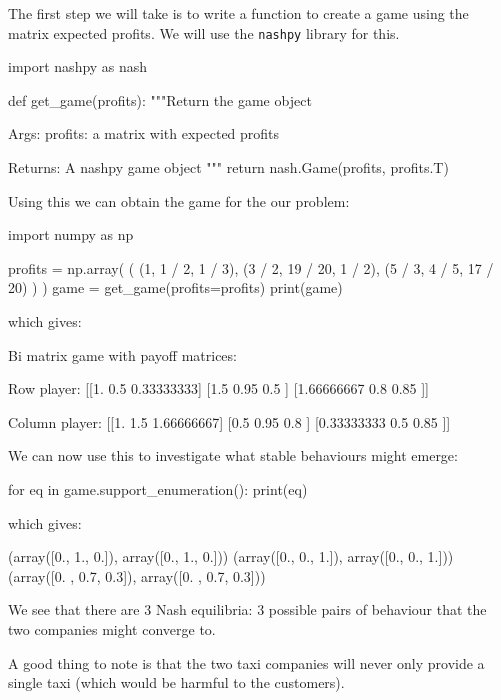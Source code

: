 The first step we will take is to write a function to create a game using the
matrix expected profits. We will use the \texttt{nashpy} library for
this.

\begin{pyin}
import nashpy as nash


def get_game(profits):
    """Return the game object

    Args:
        profits: a matrix with expected profits

    Returns:
        A nashpy game object
    """
    return nash.Game(profits, profits.T)
\end{pyin}

Using this we can obtain the game for the our problem:

\begin{pyin}
import numpy as np

profits = np.array(
    (
        (1, 1 / 2, 1 / 3),
        (3 / 2, 19 / 20, 1 / 2),
        (5 / 3, 4 / 5, 17 / 20)
    )
)
game = get_game(profits=profits)
print(game)
\end{pyin}

which gives:

\begin{pyout}
Bi matrix game with payoff matrices:

Row player:
[[1.         0.5        0.33333333]
 [1.5        0.95       0.5       ]
 [1.66666667 0.8        0.85      ]]

Column player:
[[1.         1.5        1.66666667]
 [0.5        0.95       0.8       ]
 [0.33333333 0.5        0.85      ]]
\end{pyout}

We can now use this to investigate what stable behaviours might emerge:

\begin{pyin}
for eq in game.support_enumeration():
    print(eq)
\end{pyin}

which gives:

\begin{pyout}
(array([0., 1., 0.]), array([0., 1., 0.]))
(array([0., 0., 1.]), array([0., 0., 1.]))
(array([0. , 0.7, 0.3]), array([0. , 0.7, 0.3]))
\end{pyout}

We see that there are 3 Nash equilibria: 3 possible pairs of behaviour that the
two companies might converge to.

A good thing to note is that the two taxi
companies will never only provide a single taxi (which would be harmful to the
customers).

